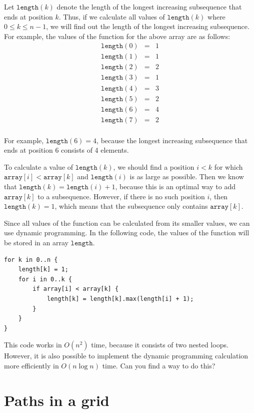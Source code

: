 Let $\texttt{length}(k)$ denote
the length of the
longest increasing subsequence
that ends at position $k$.
Thus, if we calculate all values of
$\texttt{length}(k)$ where $0 \le k \le n-1$,
we will find out the length of the
longest increasing subsequence.
For example, the values of the function
for the above array are as follows:
\[
\begin{array}{lcl}
\texttt{length}(0) & = & 1 \\
\texttt{length}(1) & = & 1 \\
\texttt{length}(2) & = & 2 \\
\texttt{length}(3) & = & 1 \\
\texttt{length}(4) & = & 3 \\
\texttt{length}(5) & = & 2 \\
\texttt{length}(6) & = & 4 \\
\texttt{length}(7) & = & 2 \\
\end{array}
\]

For example, $\texttt{length}(6)=4$,
because the longest increasing subsequence
that ends at position 6 consists of 4 elements.

To calculate a value of $\texttt{length}(k)$,
we should find a position $i<k$
for which $\texttt{array}[i]<\texttt{array}[k]$
and $\texttt{length}(i)$ is as large as possible.
Then we know that
$\texttt{length}(k)=\texttt{length}(i)+1$,
because this is an optimal way to add
$\texttt{array}[k]$ to a subsequence.
However, if there is no such position $i$,
then $\texttt{length}(k)=1$,
which means that the subsequence only contains
$\texttt{array}[k]$.

Since all values of the function can be calculated
from its smaller values,
we can use dynamic programming.
In the following code, the values
of the function will be stored in an array
$\texttt{length}$.

\begin{lstlisting}
for k in 0..n {
    length[k] = 1;
    for i in 0..k {
        if array[i] < array[k] {
            length[k] = length[k].max(length[i] + 1);
        }
    }
}
\end{lstlisting}

This code works in $O(n^2)$ time,
because it consists of two nested loops.
However, it is also possible to implement
the dynamic programming calculation
more efficiently in $O(n \log n)$ time.
Can you find a way to do this?

\section{Paths in a grid}

